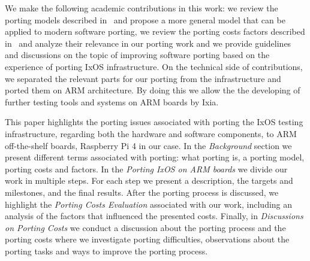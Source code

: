 We make the following academic contributions in this work: we review the porting models
described in~\cite{b1,b2,b9} and propose a more general model that can be
applied to modern software porting, we review the porting costs factors
described in~\cite{b2} and analyze their relevance in our porting work and we
provide guidelines and discussions on the topic of improving software porting
based on the experience of porting IxOS infrastructure. On the technical side of
contributions, we separated the relevant parts for our porting from the
infrastructure and ported them on ARM architecture. By doing this we allow the
the developing of further testing tools and systems on ARM boards by Ixia.

 This paper highlights the porting issues associated with porting the IxOS
testing infrastructure, regarding both the hardware and software components, to
ARM off-the-shelf boards, Raspberry Pi 4 in our case.  In the \textit{Background}
section we present different terms associated with porting: what porting is, a
porting model, porting costs and factors. In the \textit{Porting IxOS on ARM
boards} we divide our work in multiple steps. For each step we present a
description, the targets and milestones, and the final results.  After the
porting process is discussed, we highlight the \textit{Porting Costs Evaluation}
associated with our work, including an analysis of the factors that influenced
the presented costs.   Finally, in \textit{Discussions on Porting Costs} we
conduct a discussion about the porting process and the porting costs where we
investigate porting difficulties, observations about the porting tasks and
ways to improve the porting process. 
